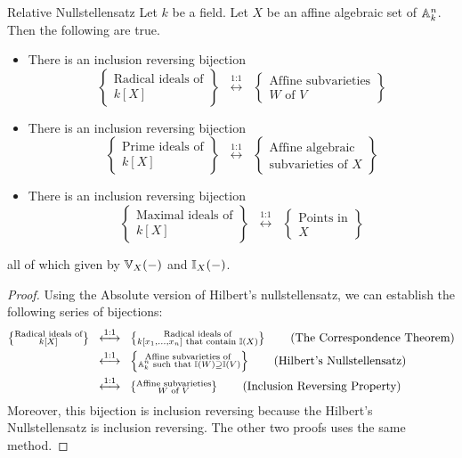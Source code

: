 \documentclass[a4paper]{article}
\begin{document}
\begin{thm}{Relative Nullstellensatz}{} Let $k$ be a field. Let $X$ be an affine algebraic set of $\mathbb{A}_k^n$. Then the following are true. 
\begin{itemize}
\item There is an inclusion reversing bijection $$\left\{\substack{\text{Radical ideals of}\\ k[X]}\right\}\;\;\overset{\text{1:1}}{\longleftrightarrow}\;\;\left\{\substack{\text{Affine subvarieties}\\ W\text{ of }V}\right\}$$
\item There is an inclusion reversing bijection $$\left\{\substack{\text{Prime ideals of}\\ k[X]}\right\}\;\;\overset{\text{1:1}}{\longleftrightarrow}\;\;\left\{\substack{\text{Affine algebraic}\\\text{subvarieties of }X}\right\}$$
\item There is an inclusion reversing bijection $$\left\{\substack{\text{Maximal ideals of}\\ k[X]}\right\}\;\;\overset{\text{1:1}}{\longleftrightarrow}\;\;\left\{\substack{\text{Points in}\\X}\right\}$$
\end{itemize} 
all of which given by $\mathbb{V}_X(-)$ and $\mathbb{I}_X(-)$. \tcbline
\begin{proof}
Using the Absolute version of Hilbert's nullstellensatz, we can establish the following series of bijections: 
\begin{align*}
\left\{\substack{\text{Radical ideals of}\\ k[X]}\right\}\;\;&\overset{\text{1:1}}{\longleftrightarrow}\;\;\left\{\substack{\text{Radical ideals of}\\ k[x_1,\dots,x_n]\text{ that contain }\mathbb{I}(X)}\right\}\tag{The Correspondence Theorem}\\
&\overset{\text{1:1}}{\longleftrightarrow}\;\;\left\{\substack{\text{Affine subvarieties of }\\ \mathbb{A}_k^n\text{ such that }\mathbb{I}(W)\supseteq\mathbb{I}(V)}\right\}\tag{Hilbert's Nullstellensatz}\\
&\overset{\text{1:1}}{\longleftrightarrow}\;\;\left\{\substack{\text{Affine subvarieties}\\ W\text{ of }V}\right\}\tag{Inclusion Reversing Property}\\
\end{align*}
Moreover, this bijection is inclusion reversing because the Hilbert's Nullstellensatz is inclusion reversing. The other two proofs uses the same method. 
\end{proof}
\end{thm}
\end{document}
